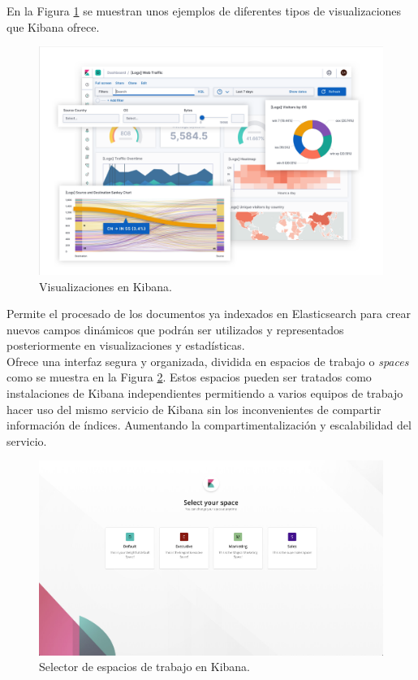 \documentclass[a4paper, 12pt]{book}
\begin{document}
		En la Figura \ref{fig:visualizations_kibana} se muestran unos ejemplos de diferentes tipos de visualizaciones que Kibana ofrece.
		
		\begin{figure}[H]
			\centering
			\includegraphics[width=12cm, keepaspectratio]{img/visualizations_kibana.png}
			\caption{Visualizaciones en Kibana.}
			\label{fig:visualizations_kibana}
		\end{figure}
		
		Permite el procesado de los documentos ya indexados en Elasticsearch para crear nuevos campos dinámicos que podrán ser utilizados y representados posteriormente en visualizaciones y estadísticas.\\
		
		Ofrece una interfaz segura y organizada, dividida en espacios de trabajo o \textit{spaces} como se muestra en la Figura \ref{fig:spaces_kibana}. Estos espacios pueden ser tratados como instalaciones de Kibana independientes permitiendo a varios equipos de trabajo hacer uso del mismo servicio de Kibana sin los inconvenientes de compartir información de índices. Aumentando la compartimentalización y escalabilidad del servicio.
		
		
		\begin{figure}[H]
			\centering
			\includegraphics[width=12cm, keepaspectratio]{img/spaces_kibana.jpg}
			\caption{Selector de espacios de trabajo en Kibana.}
			\label{fig:spaces_kibana}
		\end{figure}
		
\end{document}
